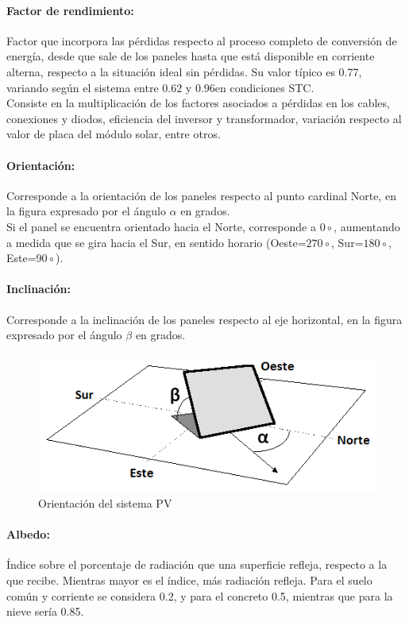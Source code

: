 \paragraph{Factor de rendimiento:} Factor que incorpora las pérdidas respecto al proceso completo de conversión de energía, desde que sale de los paneles hasta que está disponible en corriente alterna, respecto a la situación ideal sin pérdidas. Su valor típico es 0.77, variando según el sistema entre 0.62 y 0.96en condiciones STC.\\
Consiste en la multiplicación de los factores asociados a pérdidas en los cables, conexiones y diodos, eficiencia del inversor y transformador, variación respecto al valor de placa del módulo solar, entre otros.

\paragraph{Orientación:} Corresponde a la orientación de los paneles respecto al punto cardinal Norte, en la figura expresado por el ángulo $\alpha$ en grados.\\Si el panel se encuentra orientado hacia el Norte, corresponde a $0\circ$, aumentando a medida que se gira hacia el Sur, en sentido horario (Oeste=$270\circ$, Sur=$180\circ$, Este=$90\circ$).

\paragraph{Inclinación:} Corresponde a la inclinación de los paneles respecto al eje horizontal, en la figura expresado por el ángulo $\beta$ en grados.

\begin{figure}[h]
        \centering
        \includegraphics[scale=0.5]{./images/planoPanelSolar}
        \caption{Orientación del sistema PV}
        \label{orientacionSistemaPV}
\end{figure}

\paragraph{Albedo:} Índice sobre el porcentaje de radiación que una superficie refleja, respecto a la que recibe. Mientras mayor es el índice, más radiación refleja. Para el suelo común y corriente se considera 0.2, y para el concreto 0.5, mientras que para la nieve sería 0.85.

